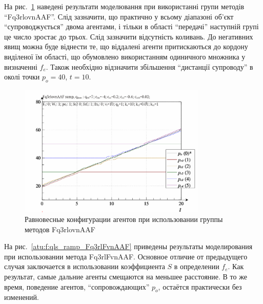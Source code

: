 На рис.~\ref{atu:f:qls_ramp_Fq3rlovnAAF} наведені результати моделювання при використанні групи методів
``Fq3rlovnAAF''. Слід зазначити, що практично у всьому діапазоні об'єкт
``супроводжується'' двома агентами, і тільки в області ``передачі'' наступній
групі це число зростає до трьох. Слід зазначити відсутність коливань. До
негативних явищ можна буде віднести те, що віддалені агенти притискаються до
кордону виділеної їм області, що обумовлено використанням одиничного множника у
визначенні $f_e$. Також необхідно відзначити збільшення
``дистанції супроводу'' в околі точки $p_o = 40$, $t = 10$.

\begin{figure}[htb!]
  \begin{center}
    \includegraphics[width=0.8\textwidth]{p/ramp/qls-p_t_pi_Fq3rlovnAAF_ramp.png}
  \end{center}
  \caption{Равновесные конфигурации агентов при использовании группы методов Fq3rlovnAAF}
  \label{atu:f:qls_ramp_Fq3rlovnAAF}
\end{figure}

На рис.~\ref{atu:f:qls_ramp_Fq3rlFvnAAF} приведены результаты моделирования
при использовании метода Fq3rlFvnAAF.
Основное отличие от предыдущего
случая заключается в использовании коэффициента $S$ в определении $f_e$.
Как результат, самые дальние агенты смещаются на меньшее расстояние.
В то же время, поведение агентов, ``сопровождающих'' $p_o$,
остаётся практически без изменений.


